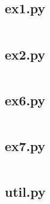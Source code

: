 \documentclass[10pt,a4paper,twoside,twocolumn]{article}
\begin{document}
\subsection{ex1.py}\label{app:ex1}
\inputminted{python}{../src/ex1.py}

\subsection{ex2.py}\label{app:ex2}
\inputminted{python}{../src/ex2.py}

\subsection{ex6.py}\label{app:ex6}
\inputminted{python}{../src/ex6.py}

\subsection{ex7.py}\label{app:ex7}
\inputminted{python}{../src/ex7.py}

\subsection{util.py}\label{app:util}
\inputminted{python}{../src/util.py}
\end{document}
